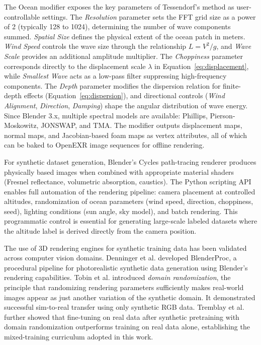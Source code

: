     The Ocean modifier exposes the key parameters of Tessendorf's method as user-controllable settings. The \emph{Resolution} parameter sets the FFT grid size as a power of 2 (typically 128 to 1024), determining the number of wave components summed. \emph{Spatial Size} defines the physical extent of the ocean patch in meters. \emph{Wind Speed} controls the wave size through the relationship $L = V^2/g$, and \emph{Wave Scale} provides an additional amplitude multiplier. The \emph{Choppiness} parameter corresponds directly to the displacement scale $\lambda$ in Equation~\ref{eq:displacement}, while \emph{Smallest Wave} acts as a low-pass filter suppressing high-frequency components. The \emph{Depth} parameter modifies the dispersion relation for finite-depth effects (Equation~\ref{eq:dispersion}), and directional controls (\emph{Wind Alignment}, \emph{Direction}, \emph{Damping}) shape the angular distribution of wave energy. Since Blender 3.x, multiple spectral models are available: Phillips, Pierson-Moskowitz, JONSWAP, and TMA. The modifier outputs displacement maps, normal maps, and Jacobian-based foam maps as vertex attributes, all of which can be baked to OpenEXR image sequences for offline rendering.

    For synthetic dataset generation, Blender's Cycles path-tracing renderer produces physically based images when combined with appropriate material shaders (Fresnel reflectance, volumetric absorption, caustics). The Python scripting API enables full automation of the rendering pipeline: camera placement at controlled altitudes, randomization of ocean parameters (wind speed, direction, choppiness, seed), lighting conditions (sun angle, sky model), and batch rendering. This programmatic control is essential for generating large-scale labeled datasets where the altitude label is derived directly from the camera position.

    The use of 3D rendering engines for synthetic training data has been validated across computer vision domains. Denninger et al. \cite{BlenderProc2023} developed BlenderProc, a procedural pipeline for photorealistic synthetic data generation using Blender's rendering capabilities. Tobin et al. \cite{Tobin2017} introduced \emph{domain randomization}, the principle that randomizing rendering parameters sufficiently makes real-world images appear as just another variation of the synthetic domain. It demonstrated successful sim-to-real transfer using only synthetic RGB data. Tremblay et al. \cite{Tremblay2018} further showed that fine-tuning on real data after synthetic pretraining with domain randomization outperforms training on real data alone, establishing the mixed-training curriculum adopted in this work.

